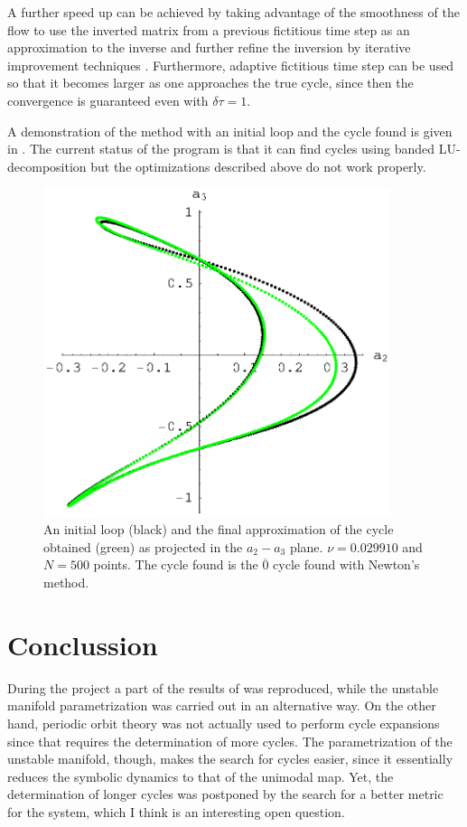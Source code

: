 \documentclass[pre,preprint,groupedaddress,showpacs,showkeys]{revtex4}
\begin{document}
    A further speed up can be achieved by taking advantage of the smoothness of the flow to use
    the inverted matrix from a previous fictitious time step as an approximation to the inverse
    and further refine the inversion by iterative improvement techniques \cite{Press:96}. Furthermore,
    adaptive fictitious time step can be used so that it becomes larger as one approaches the true
    cycle, since then the convergence is guaranteed even with $\delta \tau=1$.

    A demonstration of the method with an initial loop and the cycle found is given in .
    The current status of the program is that it can find cycles using banded LU-decomposition but
    the optimizations described above do not work properly.

  \begin{figure}[h!]
      \includegraphics[width=4in]{figs/loop.eps}
      \caption{ An initial loop (black) and the final approximation of the cycle obtained (green) as projected in
      the $a_2 - a_3$ plane. $\nu=0.029910$ and $N=500$ points. The cycle found is the $\overline{0}$ cycle found
      with Newton's method.}
  \label{fig:loop}
  \end{figure}


\section{Conclussion}

 During the project a part of the results of \cite{Christiansen:97}
 was reproduced, while the unstable manifold parametrization was
 carried out in an alternative way. On the other hand, periodic orbit
 theory was not actually used to perform cycle expansions since that
 requires the determination of more cycles. The parametrization of the
 unstable manifold, though, makes the search for cycles easier, since
 it essentially reduces the symbolic dynamics to that of the unimodal map.
 Yet, the determination of longer cycles was postponed by the search for a better metric for the
 system, which I think is an interesting open question.












 
 
 \nocite{*}
\end{document}
